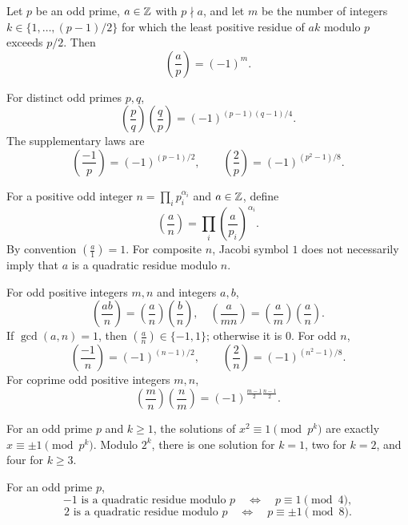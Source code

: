 \begin{theorem}
Let $p$ be an odd prime, $a\in\mathbb{Z}$ with $p\nmid a$, and let $m$ be the number of integers $k\in\{1, \dots, (p-1)/2\}$ for which the least positive residue of $ak$ modulo $p$ exceeds $p/2$. Then
\[
 \left(\frac ap\right)=(-1)^m.
\]
\end{theorem}

\begin{theorem}
For distinct odd primes $p, q$,
\[
 \left(\frac pq\right)\left(\frac qp\right)
 =(-1)^{(p-1)(q-1)/4}.
\]
The supplementary laws are
\[
 \left(\frac{-1}{p}\right)=(-1)^{(p-1)/2}, \qquad
 \left(\frac2p\right)=(-1)^{(p^2-1)/8}.
\]
\end{theorem}

\begin{definition}
For a positive odd integer $n=\prod_i p_i^{\alpha_i}$ and $a\in\mathbb{Z}$, define
\[
 \left(\frac an\right)
 =\prod_i\left(\frac a{p_i}\right)^{\alpha_i}.
\]
By convention $\left(\frac a1\right)=1$. For composite $n$, Jacobi symbol $1$ does not necessarily imply that $a$ is a quadratic residue modulo $n$.
\end{definition}

\begin{proposition}
For odd positive integers $m,n$ and integers $a,b$,
\[
 \left(\frac{ab}{n}\right)=\left(\frac an\right)\left(\frac bn\right),
\quad
 \left(\frac{a}{mn}\right)=\left(\frac am\right)\left(\frac an\right).
\]
If $\gcd(a,n)=1$, then $\left(\frac an\right)\in\{-1,1\}$; otherwise it is $0$. For odd $n$,
\[
 \left(\frac{-1}{n}\right)=(-1)^{(n-1)/2},\qquad
 \left(\frac{2}{n}\right)=(-1)^{(n^2-1)/8}.
\]
For coprime odd positive integers $m,n$,
\[
 \left(\frac mn\right)\left(\frac nm\right)
 =(-1)^{\frac{m-1}{2}\frac{n-1}{2}}.
\]
\end{proposition}

\begin{proposition}
For an odd prime $p$ and $k\ge1$, the solutions of $x^2\equiv1\pmod{p^k}$ are exactly $x\equiv\pm1\pmod{p^k}$. Modulo $2^k$, there is one solution for $k=1$, two for $k=2$, and four for $k\ge3$.
\end{proposition}


\begin{theorem}
For an odd prime $p$,
\[
 -1\text{ is a quadratic residue modulo }p
 \quad\Longleftrightarrow\quad p\equiv1\pmod4,
\]
\[
 2\text{ is a quadratic residue modulo }p
 \quad\Longleftrightarrow\quad p\equiv\pm1\pmod8.
\]
\end{theorem}

